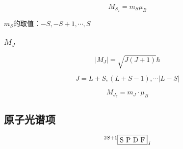 \begin{equation*}
	M_{S_z} = m_{S} \mu_B
\end{equation*}

$m_S$的取值：$-S, -S + 1, \cdots , S$

\subsubsection{$M_J$}

\begin{equation*}
	\left\lvert M_J \right\rvert = \sqrt{J(J + 1)} \hbar
\end{equation*}

\begin{equation*}
	J = L + S, (L + S - 1), \cdots |L - S|
\end{equation*}

\begin{equation*}
	M_{J_z} = m_J \cdot \mu_B
\end{equation*}

\subsection{原子光谱项}

\begin{equation*}
	^{2S + 1} \framebox{S P D F}_{J}
\end{equation*}